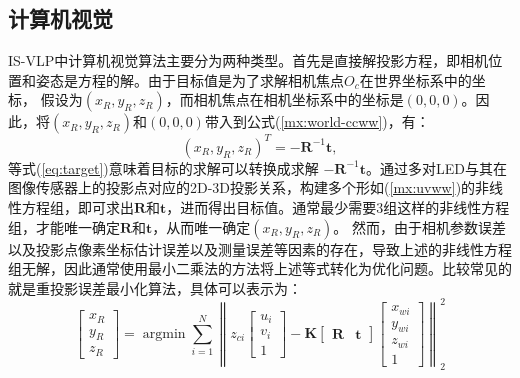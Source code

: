 \subsection{计算机视觉}
IS-VLP中计算机视觉算法主要分为两种类型。首先是直接解投影方程，即相机位置和姿态是方程的解。由于目标值是为了求解相机焦点$O_c$在世界坐标系中的坐标， 假设为$(x_R,y_R,z_R)$，而相机焦点在相机坐标系中的坐标是$(0, 0, 0)$。因此，将$(x_R,y_R,z_R)$和$(0, 0, 0)$带入到公式(\ref{mx:world-ccww})，有：
  \begin{equation}\label{eq:target}
    (x_R,y_R,z_R)^{T}=-\mathbf{R}^{-1}\mathbf{t},
  \end{equation}
等式(\ref{eq:target})意味着目标的求解可以转换成求解 $-\mathbf{R}^{-1}\mathbf{t}$。通过多对LED与其在图像传感器上的投影点对应的2D-3D投影关系，构建多个形如(\ref{mx:uvww})的非线性方程组，即可求出$\mathbf{R}$和$\mathbf{t}$，进而得出目标值。通常最少需要3组这样的非线性方程组，才能唯一确定$\mathbf{R}$和$\mathbf{t}$，从而唯一确定$(x_R,y_R,z_R)$。
 然而，由于相机参数误差以及投影点像素坐标估计误差以及测量误差等因素的存在，导致上述的非线性方程组无解，因此通常使用最小二乘法的方法将上述等式转化为优化问题。比较常见的就是重投影误差最小化算法，具体可以表示为：
  \begin{equation}\label{mx:reprojection}
    \begin{bmatrix}
      x_R\\
      y_R\\
     z_R
     \end{bmatrix}
     =\mathop{\arg\min}\limits_{}\sum_{i=1}^{N} \left \| 
     z_{ci}
     \begin{bmatrix}
      u_{i}\\
      v_{i}\\
     1
     \end{bmatrix}
     -\mathbf{K}
     \begin{bmatrix}
       \mathbf{R} &\mathbf{t}
     \end{bmatrix} 
     \begin{bmatrix}
      x_{wi}\\
      y_{wi}\\
      z_{wi}\\
     1
     \end{bmatrix}
      \right \| 
     _{2}^{2}
  \end{equation}

